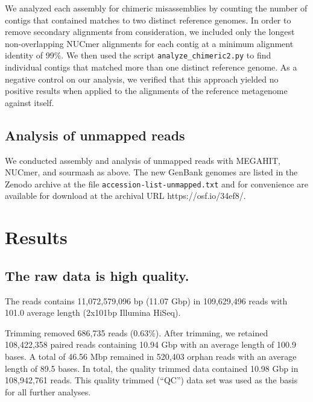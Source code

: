 \documentclass[11pt]{article}
\begin{document}

We analyzed each assembly for chimeric misassemblies by counting the
number of contigs that contained matches to two distinct reference
genomes.  In order to remove secondary alignments from consideration,
we included only the longest non-overlapping NUCmer
alignments for each contig at a minimum alignment identity of 99\%.
We then used the script {\tt analyze\_chimeric2.py} to find individual
contigs that matched more than one distinct reference genome.  As a
negative control on our analysis, we verified that this approach
yielded no positive results when applied to the alignments of the
reference metagenome against itself.


\subsection*{Analysis of unmapped reads}

We conducted assembly and analysis of unmapped reads with MEGAHIT,
NUCmer, and sourmash as above.  The new GenBank genomes are listed in
the Zenodo archive at the file {\tt accession-list-unmapped.txt} and
for convenience are available for download at the archival URL
https://osf.io/34ef8/.

\section*{Results}

\subsection*{The raw data is high quality.}

The reads contains 11,072,579,096 bp (11.07 Gbp) in 109,629,496 reads
with 101.0 average length (2x101bp Illumina HiSeq).

Trimming removed 686,735 reads (0.63\%).  After trimming, we retained
108,422,358 paired reads containing 10.94 Gbp with an average length of
100.9 bases. A total of 46.56 Mbp remained in 520,403 orphan reads with
an average length of 89.5 bases. In total, the quality trimmed data
contained 10.98 Gbp in 108,942,761 reads.  This quality trimmed (``QC'')
data set was used as the basis for all further analyses.
\end{document}
